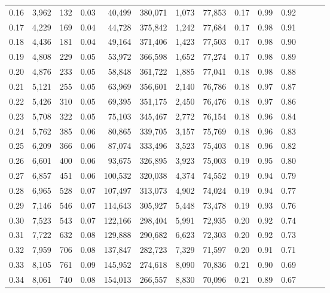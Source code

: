 \begin{tabular}{rrrrrrrrrrrrrr}
0.16 &  3,962 &    132 &  0.03 &   40,499 &  380,071 &   1,073 &  77,853 &  0.17 &  0.99 &      0.92 \\
0.17 &  4,229 &    169 &  0.04 &   44,728 &  375,842 &   1,242 &  77,684 &  0.17 &  0.98 &      0.91 \\
0.18 &  4,436 &    181 &  0.04 &   49,164 &  371,406 &   1,423 &  77,503 &  0.17 &  0.98 &      0.90 \\
0.19 &  4,808 &    229 &  0.05 &   53,972 &  366,598 &   1,652 &  77,274 &  0.17 &  0.98 &      0.89 \\
0.20 &  4,876 &    233 &  0.05 &   58,848 &  361,722 &   1,885 &  77,041 &  0.18 &  0.98 &      0.88 \\
0.21 &  5,121 &    255 &  0.05 &   63,969 &  356,601 &   2,140 &  76,786 &  0.18 &  0.97 &      0.87 \\
0.22 &  5,426 &    310 &  0.05 &   69,395 &  351,175 &   2,450 &  76,476 &  0.18 &  0.97 &      0.86 \\
0.23 &  5,708 &    322 &  0.05 &   75,103 &  345,467 &   2,772 &  76,154 &  0.18 &  0.96 &      0.84 \\
0.24 &  5,762 &    385 &  0.06 &   80,865 &  339,705 &   3,157 &  75,769 &  0.18 &  0.96 &      0.83 \\
0.25 &  6,209 &    366 &  0.06 &   87,074 &  333,496 &   3,523 &  75,403 &  0.18 &  0.96 &      0.82 \\
0.26 &  6,601 &    400 &  0.06 &   93,675 &  326,895 &   3,923 &  75,003 &  0.19 &  0.95 &      0.80 \\
0.27 &  6,857 &    451 &  0.06 &  100,532 &  320,038 &   4,374 &  74,552 &  0.19 &  0.94 &      0.79 \\
0.28 &  6,965 &    528 &  0.07 &  107,497 &  313,073 &   4,902 &  74,024 &  0.19 &  0.94 &      0.77 \\
0.29 &  7,146 &    546 &  0.07 &  114,643 &  305,927 &   5,448 &  73,478 &  0.19 &  0.93 &      0.76 \\
0.30 &  7,523 &    543 &  0.07 &  122,166 &  298,404 &   5,991 &  72,935 &  0.20 &  0.92 &      0.74 \\
0.31 &  7,722 &    632 &  0.08 &  129,888 &  290,682 &   6,623 &  72,303 &  0.20 &  0.92 &      0.73 \\
0.32 &  7,959 &    706 &  0.08 &  137,847 &  282,723 &   7,329 &  71,597 &  0.20 &  0.91 &      0.71 \\
0.33 &  8,105 &    761 &  0.09 &  145,952 &  274,618 &   8,090 &  70,836 &  0.21 &  0.90 &      0.69 \\
0.34 &  8,061 &    740 &  0.08 &  154,013 &  266,557 &   8,830 &  70,096 &  0.21 &  0.89 &      0.67 \\

\end{tabular}
